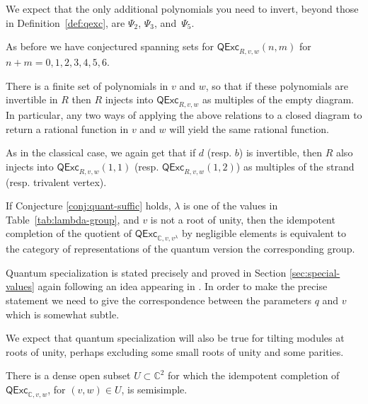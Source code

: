 \documentclass[12pt]{amsart}
\begin{document}
We expect that the only additional polynomials you need to invert,
beyond those in Definition~\ref{def:qexc}, are $\Psi_2$, $\Psi_3$, and~$\Psi_5$.

As before we have conjectured spanning sets for $\mathsf{QExc}_{R,v,w}(n,m)$
for $n+m=0,1,2,3,4,5,6$.

\begin{conjecture}
  \label{conj:quant-consist}
There is a finite set of polynomials in $v$ and $w$, so that if these
polynomials are invertible in $R$ then $R$ injects into
$\mathsf{QExc}_{R,v,w}$ as multiples of the empty diagram.  In particular, any
two ways of applying the above relations to a closed diagram to return a
rational function in $v$ and $w$ will yield the same rational function.
\end{conjecture}

As in the classical case, we again get that if $d$ (resp. $b$) is invertible,
then $R$ also injects into $\mathsf{QExc}_{R,v,w}(1,1)$ (resp.
$\mathsf{QExc}_{R,v,w}(1,2)$) as multiples of the strand (resp. trivalent
vertex).

\begin{proposition}\label{prop:quant-spec}
  If Conjecture \ref{conj:quant-suffic} holds, $\lambda$ is one of
  the values in Table~\ref{tab:lambda-group},
  and $v$ is not a root of unity, then the idempotent completion of
  the quotient of
$\mathsf{QExc}_{\mathbb{C},v,v^\lambda}$ by negligible elements is
equivalent to the category of representations of the quantum version
the corresponding group.
\end{proposition}

Quantum specialization is stated precisely and proved in Section 
\ref{sec:special-values} again following an idea appearing in \cite{1709.01278}. 
In order to make the precise statement we need to give the correspondence
between the parameters $q$ and $v$ which is somewhat subtle.

We expect that quantum specialization will also be true for tilting modules at roots of unity, 
perhaps excluding some small roots of unity and some parities.

\begin{conjecture}
There is a dense open subset $U \subset \mathbb{C}^2$ for which the idempotent
completion of $\mathsf{QExc}_{\mathbb{C},v,w}$, for $(v,w) \in U$, is
semisimple.
\end{conjecture}
\end{document}
